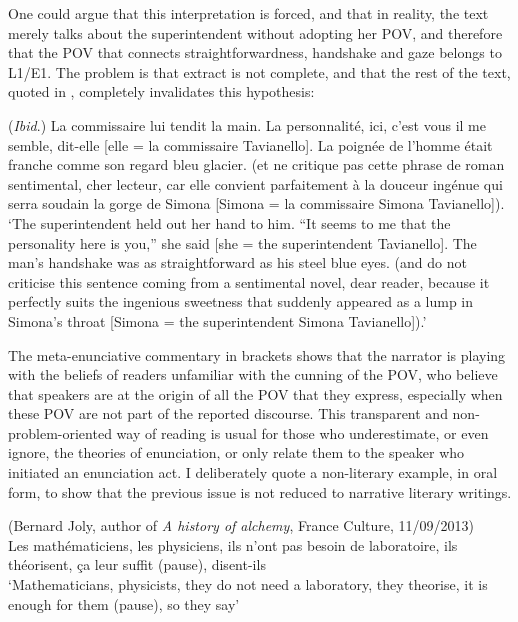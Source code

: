 \documentclass[output=paper]{langscibook}
\begin{document}
One could argue that this interpretation is forced, and that in reality, the text merely talks about the superintendent without adopting her POV, and therefore that the POV that connects straightforwardness, handshake and gaze belongs to L1/E1. The problem is that extract  is not complete, and that the rest of the text, quoted in , completely invalidates this hypothesis: 

\ea  (\textit{Ibid}.)\label{ex:06:3}
 La commissaire lui tendit la main. La personnalité, ici, c’est vous il me semble, dit-elle [elle = la commissaire Tavianello]. La poignée de l’homme était franche comme son regard bleu glacier. (et ne critique pas cette phrase de roman sentimental, cher lecteur, car elle convient parfaitement à la douceur ingénue qui serra soudain la gorge de Simona [Simona = la commissaire Simona Tavianello]).\\
 \glt `The superintendent held out her hand to him. “It seems to me that the personality here is you,” she said [she = the superintendent Tavianello]. The man's handshake was as straightforward as his steel blue eyes. (and do not criticise this sentence coming from a sentimental novel, dear reader, because it perfectly suits the ingenious sweetness that suddenly appeared as a lump in Simona's throat [Simona = the superintendent Simona Tavianello]).'
\z


The meta-enunciative commentary in brackets shows that the narrator is playing with the beliefs of readers unfamiliar with the cunning of the POV, who believe that speakers are at the origin of all the POV that they express, especially when these POV are not part of the reported discourse. This transparent and non-problem-oriented way of reading is usual for those who underestimate, or even ignore, the theories of enunciation, or only relate them to the speaker who initiated an enunciation act. I deliberately quote a non-literary example, in oral form, to show that the previous issue is not reduced to narrative literary writings.


\ea (Bernard Joly, author of \textit{A history of alchemy}, France Culture, 11/09/2013)\label{ex:06:4}\\
      Les mathématiciens, les physiciens, ils n’ont pas besoin de laboratoire, ils théorisent, ça leur suffit (pause), disent-ils\\
\glt `Mathematicians, physicists, they do not need a laboratory, they theorise, it is enough for them (pause), so they say'
\z
\end{document}
